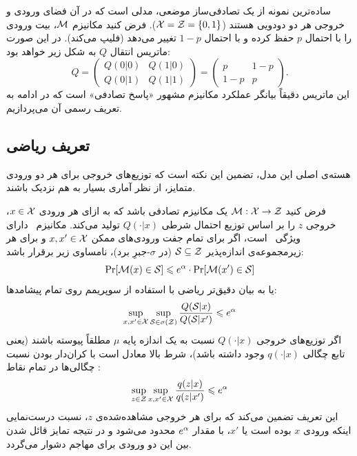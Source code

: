 \begin{مثال}
\label{ex:binary-symmetric-channel}
ساده‌ترین نمونه از یک تصادفی‌ساز موضعی، مدلی است که در آن فضای ورودی و خروجی هر دو دودویی هستند ($\Xset = \Zset = \{0, 1\}$). فرض کنید مکانیزم $\mech$، بیت ورودی را با احتمال $p$ حفظ کرده و با احتمال $1-p$ تغییر می‌دهد (فلیپ می‌کند). در این صورت ماتریس انتقال $Q$ به شکل زیر خواهد بود:
\begin{equation}
Q = 
\begin{pmatrix}
Q(0|0) & Q(1|0) \\
Q(0|1) & Q(1|1)
\end{pmatrix} 
= 
\begin{pmatrix}
p & 1-p \\
1-p & p
\end{pmatrix}.
\end{equation}
این ماتریس دقیقاً بیانگر عملکرد مکانیزم مشهور «پاسخ تصادفی» است که در ادامه به تعریف رسمی آن می‌پردازیم.
\end{مثال}



\subsection{تعریف ریاضی }

هسته‌ی اصلی این مدل، تضمین این نکته است که توزیع‌های خروجی برای هر دو ورودی متمایز، از نظر آماری بسیار به هم نزدیک باشند.
\begin{تعریف}[\LDP]
\label{def:alpha-ldp}
فرض کنید $\mech: \Xset \to \Zset$ یک مکانیزم تصادفی باشد که به ازای هر ورودی $x \in \Xset$، خروجی $z$ را بر اساس توزیع احتمال شرطی $Q(\cdot|x)$ تولید می‌کند.
مکانیزم \mech \ دارای ویژگی \LDP \ است، اگر برای تمام جفت ورودی‌های ممکن $x, x' \in \Xset$ و برای هر زیرمجموعه‌ی اندازه‌پذیر $\Sset \subseteq \Zset$ (در $\sigma$-جبرِ برد)، نامساوی زیر برقرار باشد:
\begin{equation}
\label{eq:ldp-def-measure}
\Pr[\mech(x) \in \Sset] \le e^{\al} \cdot \Pr[\mech(x') \in \Sset]
\end{equation}
یا به بیان دقیق‌تر ریاضی با استفاده از سوپریمم روی تمام پیشامدها:
\begin{equation}
\label{eq:ldp-def-sup}
\sup_{x, x' \in \Xset} \sup_{\Sset \in \sigma(\Zset)} \frac{Q(\Sset|x)}{Q(\Sset|x')} \le e^{\al}
\end{equation}
اگر توزیع‌های خروجی $Q(\cdot|x)$ نسبت به یک اندازه پایه $\mu$ مطلقاً پیوسته باشند (یعنی تابع چگالی $q(\cdot|x)$ وجود داشته باشد)، شرط بالا معادل است با کران‌دار بودن نسبت چگالی‌ها در تمام نقاط \cite{Duchi2013}:
\begin{equation}
\label{eq:ldp-density}
\sup_{z \in \Zset} \sup_{x, x' \in \Xset} \frac{q(z|x)}{q(z|x')} \le e^{\al}
\end{equation}
این تعریف تضمین می‌کند که برای هر خروجی مشاهده‌شده‌ی $z$، نسبت درست‌نمایی اینکه ورودی $x$ بوده است یا $x'$، با مقدار $e^{\alpha}$ محدود می‌شود و در نتیجه تمایز قائل شدن بین این دو ورودی برای مهاجم دشوار می‌گردد.
\end{تعریف}


